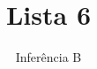 \documentclass[10pt,brazil,addpoints]{exam}
\begin{document}
\title{Lista 6}


\author{
 Inferência B
  \date{}
}


\maketitle
\end{document}
